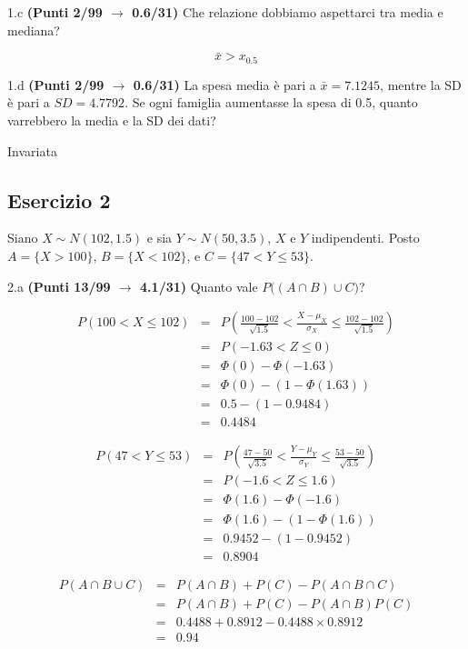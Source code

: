 \documentclass[
  11pt,
]{book}
\theoremstyle{mytheoremstyle}
\theoremstyle{mydefstyle}
\newenvironment{sol}
  {
  \begin{tcolorbox}[enhanced,breakable,arc=0.1mm,boxrule=1pt,colback=white,colframe=iblue,
  title=\bf \fontfamily{lmss}\selectfont \hspace{.5 cm} Soluzione,drop fuzzy shadow]

}{
\end{tcolorbox}
  }
\begin{document}
1.c \textbf{(Punti 2/99 \(\rightarrow\) 0.6/31)} Che relazione dobbiamo aspettarci tra media e mediana?

\begin{sol}
\[
\bar x > x_{0.5}
\]

\end{sol}

1.d \textbf{(Punti 2/99 \(\rightarrow\) 0.6/31)} La spesa media è pari a \(\bar x=7.1245\), mentre la SD è pari a \(SD=4.7792\).
Se ogni famiglia aumentasse la spesa di 0.5, quanto varrebbero la media e la SD dei dati?

\begin{sol}
Invariata

\end{sol}

\subsection{Esercizio 2}\label{esercizio-2-10}

Siano \(X\sim N(102,1.5)\) e sia \(Y\sim N(50,3.5)\), \(X\) e \(Y\) indipendenti. Posto \(A=\{X>100\}\), \(B=\{X<102\}\), e \(C=\{47<Y\le 53\}\).

2.a \textbf{(Punti 13/99 \(\rightarrow\) 4.1/31)} Quanto vale \(P\Big((A\cap B)\cup C\Big)\)?

\begin{sol}
\begin{eqnarray*}
   P( 100 < X \leq  102 ) &=& P\left( \frac { 100  -  102 }{\sqrt{ 1.5 }} < \frac { X  -  \mu_X }{ \sigma_X } \leq \frac { 102  -  102 }{\sqrt{ 1.5 }}\right)  \\
              &=& P\left(  -1.63  < Z \leq  0 \right) \\
              &=& \Phi( 0 )-\Phi( -1.63 )\\
              &=&  \Phi( 0 )-(1-\Phi( 1.63 )) \\ &=&  0.5 -(1- 0.9484 ) \\ 
              &=&  0.4484 
   \end{eqnarray*}

\begin{eqnarray*}
   P( 47 < Y \leq  53 ) &=& P\left( \frac { 47  -  50 }{\sqrt{ 3.5 }} < \frac { Y  -  \mu_Y }{ \sigma_Y } \leq \frac { 53  -  50 }{\sqrt{ 3.5 }}\right)  \\
              &=& P\left(  -1.6  < Z \leq  1.6 \right) \\
              &=& \Phi( 1.6 )-\Phi( -1.6 )\\
              &=&  \Phi( 1.6 )-(1-\Phi( 1.6 )) \\ &=&  0.9452 -(1- 0.9452 ) \\ 
              &=&  0.8904 
   \end{eqnarray*}

\begin{eqnarray*}
  P(A\cap B\cup C) &=&  P(A\cap B)+P(C)-P(A\cap B\cap C)\\
  &=& P(A\cap B)+P(C)-P(A\cap B)P(C)\\
  &=& 0.4488+0.8912-0.4488\times0.8912\\
  &=& 0.94
\end{eqnarray*}

\end{sol}
\end{document}
